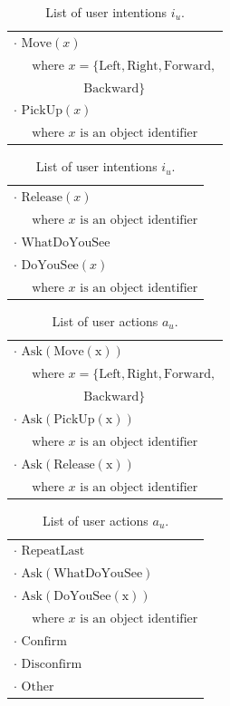\begin{table}[p]
\begin{footnotesize}
\begin{tabular}{p{60mm}} 
$\cdot$ $\mathrm{Move}(x) $ \\ $ \ \ \ \ \ \text{ where } x=\{\mathrm{Left,Right,Forward,}$ \\ $\ \ \ \ \ \ \ \ \ \ \ \ \ \ \ \ \ \ \ \ \ \ \ \ \ \mathrm{Backward}\} $ \\ 
$\cdot$ $\mathrm{PickUp}(x) $ \\ $\ \ \ \ \  \text{ where } x \text{ is an object identifier}$ 
\end{tabular}
\hspace{2cm}
\begin{tabular}{p{60mm}} 
$\cdot$ $\mathrm{Release}(x) $ \\ $\ \ \ \ \  \text{ where } x \text{ is an object identifier}$ \\
$\cdot$ $\mathrm{WhatDoYouSee}$ \\
$\cdot$ $\mathrm{DoYouSee}(x) $ \\ $\ \ \ \ \  \text{ where } x \text{ is an object identifier}$ 
\end{tabular}
\end{footnotesize}
 \caption{List of user intentions $i_u$.} 
\label{table:userintents_exp2}
\end{table}


\begin{table}[p]
\begin{footnotesize}
\begin{tabular}{p{60mm}} 
$\cdot$ $\mathrm{Ask(Move(x))} $ \\ $ \ \ \ \ \ \text{ where } x=\{\mathrm{Left,Right,Forward,}$ \\ $\ \ \ \ \ \ \ \ \ \ \ \ \ \ \ \ \ \ \ \ \ \ \ \ \ \mathrm{Backward}\} $ \\ 
$\cdot$ $\mathrm{Ask(PickUp(x))} $ \\ $\ \ \ \ \  \text{ where } x \text{ is an object identifier}$ \\
$\cdot$ $\mathrm{Ask(Release(x))} $ \\ $\ \ \ \ \  \text{ where } x \text{ is an object identifier}$ 
\end{tabular}
\hspace{2cm}
\begin{tabular}{p{60mm}} 
$\cdot$ $\mathrm{RepeatLast}$ \\
$\cdot$ $\mathrm{Ask(WhatDoYouSee)}$ \\
$\cdot$ $\mathrm{Ask(DoYouSee(x))} $ \\ $\ \ \ \ \  \text{ where } x \text{ is an object identifier}$ \\
$\cdot$ $\mathrm{Confirm}$ \\
$\cdot$ $\mathrm{Disconfirm}$ \\
$\cdot$ $\mathrm{Other}$ 
\end{tabular}
\end{footnotesize}
 \caption{List of user actions $a_u$.} 
\label{table:userdas_exp2}
\end{table}

